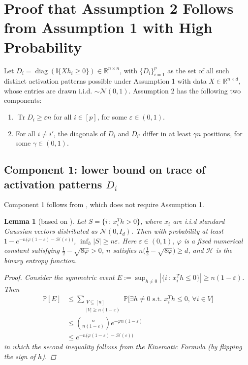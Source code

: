 \documentclass{article} %
\DeclareMathOperator{\Tr}{Tr}
\newcommand{\n}{\ensuremath{n}}
\newcommand{\p}{\ensuremath{p}}
\newcommand{\datadim}{\ensuremath{d}}
\newcommand{\X}{\ensuremath{X}}
\newcommand{\h}{\ensuremath{h}}
\newtheorem{lemma}{Lemma}
\DeclareMathOperator{\diag}{diag}
\newcommand{\Prob}{\ensuremath{{\mathbb{P}}}}
\newcommand{\1}{\ensuremath{{\sf (i)}}}
\newcommand{\2}{\ensuremath{{\sf (ii)}}}
\newcommand{\3}{\ensuremath{{\sf (iii)}}}
\newcommand{\4}{\ensuremath{{\sf (iv)}}}
\newcommand{\5}{\ensuremath{{\sf (v)}}}
\newcommand{\6}{\ensuremath{{\sf (vi)}}}
\newcommand{\R}{\mathbb{R}}
\begin{document}
\section{Proof that Assumption 2 Follows from Assumption 1 with High Probability}
\label{sec:assumptionproof}

Let $D_i = \diag{(\mathbb{I}\{\X\h_i \geq 0\})} \in \R^{\n \times \n}$, with $\{D_i\}_{i=1}^\p$ as the set of all such distinct activation patterns possible under Assumption 1 with data $\X \in \R^{\n \times \datadim}$, whose entries are drawn i.i.d. $\sim \mathcal{N}(0,1)$. Assumption 2 has the following two components:
    \begin{enumerate}
        \item $\Tr{D_i} \geq \varepsilon \n$ for all $i \in [\p]$, for some $\varepsilon \in (0,1)$.
        \item For all $i \neq i'$, the diagonals of $D_i$ and $D_{i'}$ differ in at least $\gamma \n$ positions, for some $\gamma \in (0,1)$.
    \end{enumerate}

\subsection{Component 1: lower bound on trace of activation patterns $D_i$}

Component 1 follows from , which does not require Assumption 1.

\begin{lemma}[based on \citet{ergen2019random}] \label{lemma:lowerboundsize}
Let $S=\{i\,:\, x_i^T\h> 0\}$, where $x_i$ are i.i.d standard Gaussian vectors distributed as $\mathcal{N}(0,I_\datadim)$. Then with probability at least $1 - e^{-\n\big( \varphi (1-\varepsilon)- \mathcal{H}(\varepsilon) \big)}$, 
$\inf_{\h} |S| \ge \n \varepsilon $. Here $\varepsilon \in (0,1)$, $\varphi$ is a fixed numerical constant satisfying $\frac{1}{2}-\sqrt{8\varphi} > 0$, $n$ satisfies $\n\big(\frac{1}{2}-\sqrt{8\varphi}\big) \geq \datadim$, and $\mathcal{H}$ is the binary entropy function.
\begin{proof}
Consider the symmetric event
$E := \sup_{\h\neq 0} |\{i\,:\, x_i^T\h\le 0\}| \ge \n (1-\varepsilon)$. Then
%
\begin{align*}
\Prob[E] &\le \sum_{\substack{V\subseteq [\n]\\ |V|\ge \n(1-\varepsilon) }} \Prob\big[ \exists \h\neq 0 \mbox{  s.t.  } x_i^T \h \le 0,\, \forall i\in V \big]\\
 &\le {\n \choose \n(1-\varepsilon)} e^{-\varphi \n (1-\varepsilon)}\\
 & \le e^{-\n\big( \varphi (1-\varepsilon)- \mathcal{H}(\varepsilon) \big)}
\end{align*}
in which the second inequality follows from the Kinematic Formula (by flipping the sign of $\h$).
\end{proof}
\end{lemma}
\end{document}
